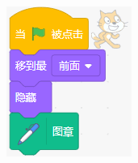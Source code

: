 \documentclass[10pt, a4paper]{article}
\begin{document}
\begin{enumerate}
\begin{figure}[htbp]
\begin{minipage}[t]{.45\textwidth}
\begin{minipage}[t]{.43\textwidth}
                \end{minipage}
                \begin{minipage}[t]{.26\textwidth}
                    \centering
                    \includegraphics[width=\textwidth]{figure/11-2.png}
                \end{minipage}
                \begin{minipage}[t]{.26\textwidth}
                    \centering

\end{minipage}
\end{minipage}
\end{figure}
\end{enumerate}
\end{document}
